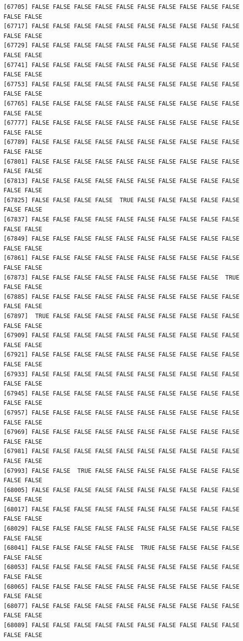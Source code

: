 \documentclass[
  a4paper,
  DIV=11,
  numbers=noendperiod]{scrartcl}
\begin{document}
\begin{verbatim}
[67705] FALSE FALSE FALSE FALSE FALSE FALSE FALSE FALSE FALSE FALSE FALSE FALSE
[67717] FALSE FALSE FALSE FALSE FALSE FALSE FALSE FALSE FALSE FALSE FALSE FALSE
[67729] FALSE FALSE FALSE FALSE FALSE FALSE FALSE FALSE FALSE FALSE FALSE FALSE
[67741] FALSE FALSE FALSE FALSE FALSE FALSE FALSE FALSE FALSE FALSE FALSE FALSE
[67753] FALSE FALSE FALSE FALSE FALSE FALSE FALSE FALSE FALSE FALSE FALSE FALSE
[67765] FALSE FALSE FALSE FALSE FALSE FALSE FALSE FALSE FALSE FALSE FALSE FALSE
[67777] FALSE FALSE FALSE FALSE FALSE FALSE FALSE FALSE FALSE FALSE FALSE FALSE
[67789] FALSE FALSE FALSE FALSE FALSE FALSE FALSE FALSE FALSE FALSE FALSE FALSE
[67801] FALSE FALSE FALSE FALSE FALSE FALSE FALSE FALSE FALSE FALSE FALSE FALSE
[67813] FALSE FALSE FALSE FALSE FALSE FALSE FALSE FALSE FALSE FALSE FALSE FALSE
[67825] FALSE FALSE FALSE FALSE  TRUE FALSE FALSE FALSE FALSE FALSE FALSE FALSE
[67837] FALSE FALSE FALSE FALSE FALSE FALSE FALSE FALSE FALSE FALSE FALSE FALSE
[67849] FALSE FALSE FALSE FALSE FALSE FALSE FALSE FALSE FALSE FALSE FALSE FALSE
[67861] FALSE FALSE FALSE FALSE FALSE FALSE FALSE FALSE FALSE FALSE FALSE FALSE
[67873] FALSE FALSE FALSE FALSE FALSE FALSE FALSE FALSE FALSE  TRUE FALSE FALSE
[67885] FALSE FALSE FALSE FALSE FALSE FALSE FALSE FALSE FALSE FALSE FALSE FALSE
[67897]  TRUE FALSE FALSE FALSE FALSE FALSE FALSE FALSE FALSE FALSE FALSE FALSE
[67909] FALSE FALSE FALSE FALSE FALSE FALSE FALSE FALSE FALSE FALSE FALSE FALSE
[67921] FALSE FALSE FALSE FALSE FALSE FALSE FALSE FALSE FALSE FALSE FALSE FALSE
[67933] FALSE FALSE FALSE FALSE FALSE FALSE FALSE FALSE FALSE FALSE FALSE FALSE
[67945] FALSE FALSE FALSE FALSE FALSE FALSE FALSE FALSE FALSE FALSE FALSE FALSE
[67957] FALSE FALSE FALSE FALSE FALSE FALSE FALSE FALSE FALSE FALSE FALSE FALSE
[67969] FALSE FALSE FALSE FALSE FALSE FALSE FALSE FALSE FALSE FALSE FALSE FALSE
[67981] FALSE FALSE FALSE FALSE FALSE FALSE FALSE FALSE FALSE FALSE FALSE FALSE
[67993] FALSE FALSE  TRUE FALSE FALSE FALSE FALSE FALSE FALSE FALSE FALSE FALSE
[68005] FALSE FALSE FALSE FALSE FALSE FALSE FALSE FALSE FALSE FALSE FALSE FALSE
[68017] FALSE FALSE FALSE FALSE FALSE FALSE FALSE FALSE FALSE FALSE FALSE FALSE
[68029] FALSE FALSE FALSE FALSE FALSE FALSE FALSE FALSE FALSE FALSE FALSE FALSE
[68041] FALSE FALSE FALSE FALSE FALSE  TRUE FALSE FALSE FALSE FALSE FALSE FALSE
[68053] FALSE FALSE FALSE FALSE FALSE FALSE FALSE FALSE FALSE FALSE FALSE FALSE
[68065] FALSE FALSE FALSE FALSE FALSE FALSE FALSE FALSE FALSE FALSE FALSE FALSE
[68077] FALSE FALSE FALSE FALSE FALSE FALSE FALSE FALSE FALSE FALSE FALSE FALSE
[68089] FALSE FALSE FALSE FALSE FALSE FALSE FALSE FALSE FALSE FALSE FALSE FALSE

\end{verbatim}
\end{document}
